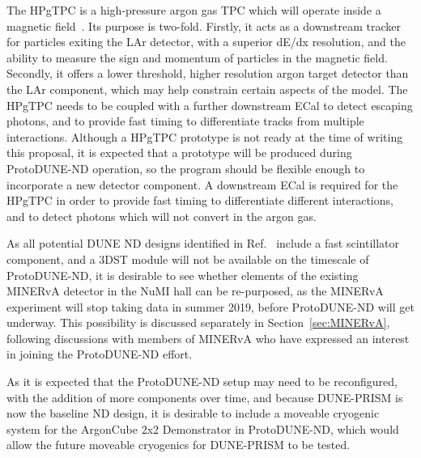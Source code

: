 The HPgTPC is a high-pressure argon gas TPC which will operate inside a magnetic field~\cite{dune_ndcsg}. Its purpose is two-fold. Firstly, it acts as a downstream tracker for particles exiting the LAr detector, with a superior dE/dx resolution, and the ability to measure the sign and momentum of particles in the magnetic field. Secondly, it offers a lower threshold, higher resolution argon target detector than the LAr component, which may help constrain certain aspects of the model. The HPgTPC needs to be coupled with a further downstream ECal to detect escaping photons, and to provide fast timing to differentiate tracks from multiple interactions. Although a HPgTPC prototype is not ready at the time of writing this proposal, it is expected that a prototype will be produced during ProtoDUNE-ND operation, so the program should be flexible enough to incorporate a new detector component. A downstream ECal is required for the HPgTPC in order to provide fast timing to differentiate different interactions, and to detect photons which will not convert in the argon gas.

As all potential DUNE ND designs identified in Ref.~\cite{dune_ndcsg} include a fast scintillator component, and a 3DST module will not be available on the timescale of ProtoDUNE-ND, it is desirable to see whether elements of the existing MINERvA detector in the NuMI hall can be re-purposed, as the MINERvA experiment will stop taking data in summer 2019, before ProtoDUNE-ND will get underway. This possibility is discussed separately in Section~\ref{sec:MINERvA}, following discussions with members of MINERvA who have expressed an interest in joining the ProtoDUNE-ND effort.

As it is expected that the ProtoDUNE-ND setup may need to be reconfigured, with the addition of more components over time, and because DUNE-PRISM is now the baseline ND design, it is desirable to include a moveable cryogenic system for the ArgonCube 2x2 Demonstrator in ProtoDUNE-ND, which would allow the future moveable cryogenics for DUNE-PRISM to be tested.

